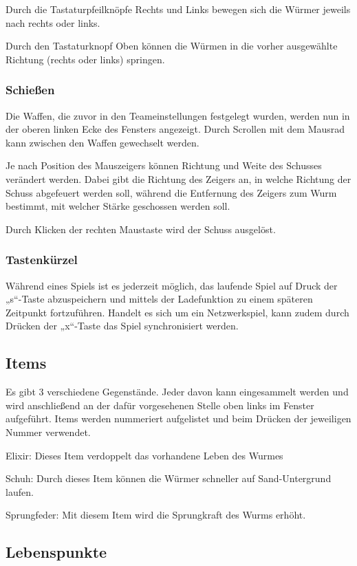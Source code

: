 \documentclass{scrreprt}
\begin{document}
Durch die Tastaturpfeilknöpfe Rechts und Links bewegen sich die Würmer jeweils nach rechts oder links.

Durch den Tastaturknopf Oben können die Würmen in die vorher ausgewählte Richtung (rechts oder links) springen.

\subsubsection{Schießen}

Die Waffen, die zuvor in den Teameinstellungen festgelegt wurden, werden nun in der oberen linken Ecke des Fensters angezeigt.
Durch Scrollen mit dem Mausrad kann zwischen den Waffen gewechselt werden.

Je nach Position des Mauszeigers können Richtung und Weite des Schusses verändert werden. Dabei gibt die Richtung des Zeigers an, in welche Richtung der Schuss abgefeuert werden soll, während die Entfernung des Zeigers zum Wurm bestimmt, mit welcher Stärke geschossen werden soll.

Durch Klicken der rechten Maustaste wird der Schuss ausgelöst.

\subsubsection{Tastenkürzel}

Während eines Spiels ist es jederzeit möglich, das laufende Spiel auf Druck der „s“-Taste abzuspeichern und mittels der Ladefunktion zu einem späteren Zeitpunkt fortzuführen.
Handelt es sich um ein Netzwerkspiel, kann zudem durch Drücken der „x“-Taste das Spiel synchronisiert werden.

\subsection{Items}

Es gibt 3 verschiedene Gegenstände. Jeder davon kann eingesammelt werden und wird anschließend an der dafür vorgesehenen Stelle oben links im Fenster aufgeführt.
Items werden nummeriert aufgelistet und beim Drücken der jeweiligen Nummer verwendet. 

Elixir: Dieses Item verdoppelt das vorhandene Leben des Wurmes

Schuh: Durch dieses Item können die Würmer schneller auf Sand-Untergrund laufen.

Sprungfeder: Mit diesem Item wird die Sprungkraft des Wurms erhöht.

\subsection{Lebenspunkte}
\end{document}
